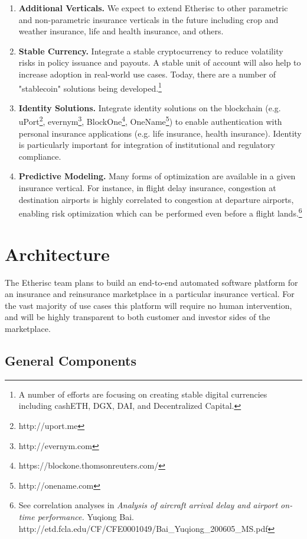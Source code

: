 \documentclass[12pt]{article}
\begin{document}
\begin{enumerate}
    \item \textbf{Additional Verticals.} We expect to extend Etherisc to other parametric and non-parametric insurance verticals in the future including crop and weather insurance, life and health insurance, and others.
    \item \textbf{Stable Currency.} Integrate a stable cryptocurrency to reduce volatility risks in policy issuance and payouts. A stable unit of account will also help to increase adoption in real-world use cases. Today, there are a number of "stablecoin" solutions being developed.\footnote{A number of efforts are focusing on creating stable digital currencies including cashETH, DGX, DAI, and Decentralized Capital.}
    \item \textbf{Identity Solutions.} Integrate identity solutions on the blockchain (e.g. uPort\footnote{http://uport.me}, evernym\footnote{http://evernym.com}, BlockOne\footnote{https://blockone.thomsonreuters.com/}, OneName\footnote{http://onename.com}) to enable authentication with personal insurance applications (e.g. life insurance, health insurance). Identity is particularly important for integration of institutional and regulatory compliance.
    \item \textbf{Predictive Modeling.} Many forms of optimization are available in a given insurance vertical. For instance, in flight delay insurance, congestion at destination airports is highly correlated to congestion at departure airports, enabling risk optimization which can be performed even before a flight lands.\footnote{See correlation analyses in \textit{Analysis of aircraft arrival delay and airport on-time performance.} Yuqiong Bai. http://etd.fcla.edu/CF/CFE0001049/Bai\_Yuqiong\_200605\_MS.pdf}
\end{enumerate}

\section{Architecture \label{architecture}}

The Etherisc team plans to build an end-to-end automated software platform for an insurance and reinsurance marketplace in a particular insurance vertical. For the vast majority of use cases this platform will require no human intervention, and will be highly transparent to both customer and investor sides of the marketplace.

\subsection{General Components}
\end{document}
